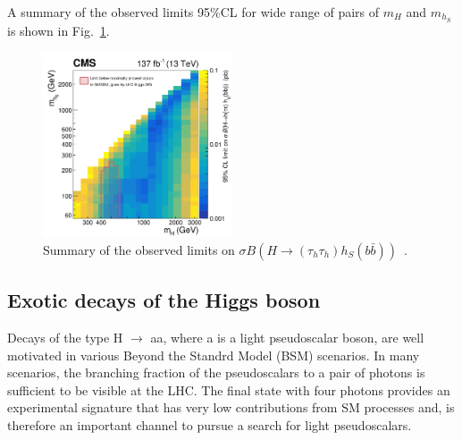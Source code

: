 \documentclass{blois}
\begin{document}
A summary of the observed limits 95$\%$CL for wide range of pairs of $m_{H}$ and $ m_{h_{S}}$ is shown in Fig.~\ref{fig:limits_tautaubb}.
\begin{figure}[!htb]
    \begin{center}
        \includegraphics[width=0.5\textwidth]{CMS-HIG-20-014_Figure_006.png}
        \caption{
           Summary of the observed limits on $\sigma B(H \rightarrow (\tau_{h}\tau_{h})h_{S}(b\bar{b}))$~\protect\cite{CMS:tautaubb}.
        }
        \label{fig:limits_tautaubb}
    \end{center}
\end{figure}
\vspace{2cm}
\subsection{Exotic decays of the Higgs boson}\label{subsec:exo}

Decays of the type H $\rightarrow$ aa, where a is a light pseudoscalar boson, are well motivated in various Beyond the Standrd Model (BSM) scenarios. In many scenarios, the branching fraction of the pseudoscalars to a pair of photons is sufficient to be visible at the LHC. The final state with four photons provides an experimental signature that has very low contributions from SM processes and, is therefore an important channel to pursue a search for light pseudoscalars.
\end{document}
